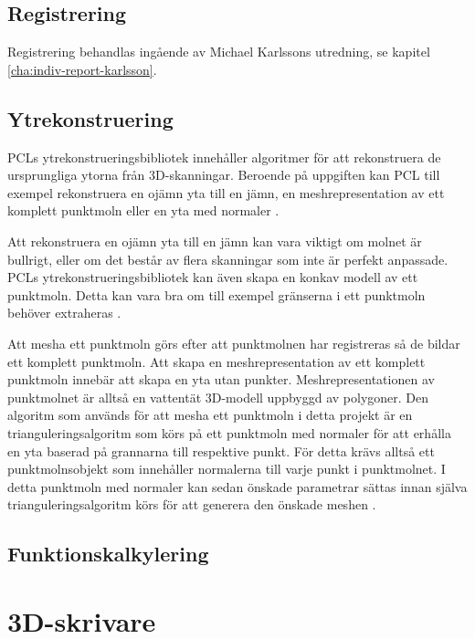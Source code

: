\subsection{Registrering}
Registrering behandlas ingående av Michael Karlssons utredning, se kapitel \ref{cha:indiv-report-karlsson}.

\subsection{Ytrekonstruering}
PCLs ytrekonstrueringsbibliotek innehåller algoritmer för att rekonstruera de ursprungliga ytorna från 3D-skanningar. Beroende på uppgiften kan PCL till exempel rekonstruera en ojämn yta till en jämn, en meshrepresentation av ett komplett punktmoln eller en yta med normaler \cite{pcl_surface_reconstruction}. 

Att rekonstruera en ojämn yta till en jämn kan vara viktigt om molnet är bullrigt, eller om det består av flera skanningar som inte är perfekt anpassade. PCLs ytrekonstrueringsbibliotek kan även skapa en konkav modell av ett punktmoln. Detta kan vara bra om till exempel gränserna i ett punktmoln behöver extraheras \cite{pcl_surface_reconstruction}.

Att mesha ett punktmoln görs efter att punktmolnen har registreras så de bildar ett komplett punktmoln. Att skapa en meshrepresentation av ett komplett punktmoln innebär att skapa en yta utan punkter. Meshrepresentationen av punktmolnet är alltså en vattentät 3D-modell uppbyggd av polygoner. Den algoritm som används för att mesha ett punktmoln i detta projekt är en trianguleringsalgoritm som körs på ett punktmoln med normaler för att erhålla en yta baserad på grannarna till respektive punkt. För detta krävs alltså ett punktmolnsobjekt som innehåller normalerna till varje punkt i punktmolnet. I detta punktmoln med normaler kan sedan önskade parametrar sättas innan själva trianguleringsalgoritm körs för att generera den önskade meshen \cite{pcl_surface_reconstruction}\cite{pcl_triangulation_algorithm}. 

\subsection{Funktionskalkylering}

\section{3D-skrivare}


